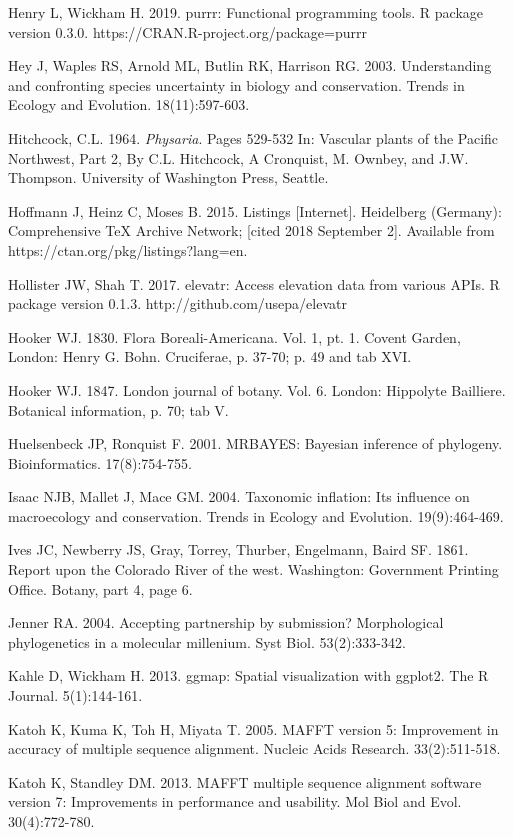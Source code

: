 Henry L, Wickham H. 2019. purrr: Functional programming tools. R package version 0.3.0. https://CRAN.R-project.org/package=purrr

Hey J, Waples RS, Arnold ML, Butlin RK, Harrison RG. 2003. Understanding and confronting species uncertainty in biology and conservation. Trends in Ecology and Evolution. 18(11):597-603.

Hitchcock, C.L. 1964. \textit{Physaria}. Pages 529-532 In: Vascular plants of the Pacific Northwest, Part 2, By C.L. Hitchcock, A Cronquist, M. Ownbey, and J.W. Thompson. University of Washington Press, Seattle.

Hoffmann J, Heinz C, Moses B. 2015. Listings [Internet]. Heidelberg (Germany): Comprehensive TeX Archive Network; [cited 2018 September 2]. Available from https://ctan.org/pkg/listings?lang=en.

Hollister JW, Shah T. 2017. elevatr: Access elevation data from various APIs. R package version 0.1.3. http://github.com/usepa/elevatr

Hooker WJ. 1830. Flora Boreali-Americana. Vol. 1, pt. 1. Covent Garden, London: Henry G. Bohn. Cruciferae, p. 37-70; p. 49 and tab XVI.

Hooker WJ. 1847. London journal of botany. Vol. 6. London: Hippolyte Bailliere. Botanical information, p. 70; tab V.  

Huelsenbeck JP, Ronquist F. 2001. MRBAYES: Bayesian inference of phylogeny. Bioinformatics. 17(8):754-755.

Isaac NJB, Mallet J, Mace GM. 2004. Taxonomic inflation: Its influence on macroecology and conservation. Trends in Ecology and Evolution. 19(9):464-469.

Ives JC, Newberry JS, Gray, Torrey, Thurber, Engelmann, Baird SF. 1861. Report upon the Colorado River of the west. Washington: Government Printing Office. Botany, part 4, page 6. 

Jenner RA. 2004. Accepting partnership by submission? Morphological phylogenetics in a molecular millenium. Syst Biol. 53(2):333-342.

Kahle D, Wickham H. 2013. ggmap: Spatial visualization with ggplot2. The R Journal. 5(1):144-161.

Katoh K, Kuma K, Toh H, Miyata T. 2005. MAFFT version 5: Improvement in accuracy of multiple sequence alignment. Nucleic Acids Research. 33(2):511-518.

Katoh K, Standley DM. 2013. MAFFT multiple sequence alignment software version 7: Improvements in performance and usability.  Mol Biol and Evol. 30(4):772-780.


